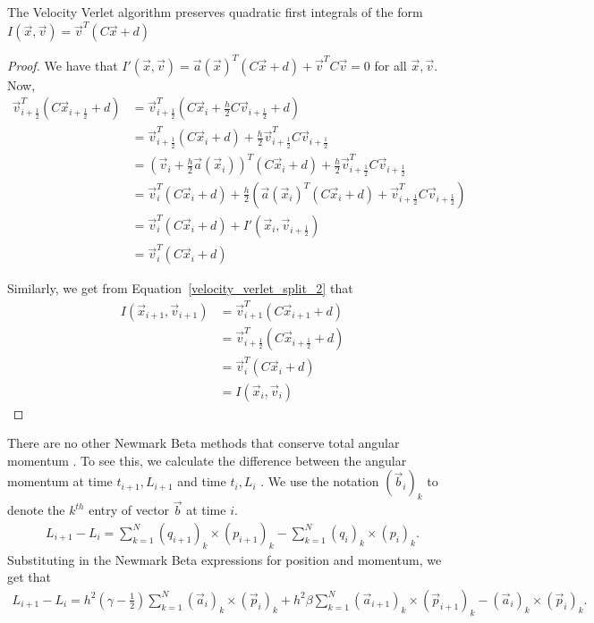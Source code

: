 \documentclass[../Main.tex]{subfiles}
\begin{document}
\begin{theorem} The Velocity Verlet algorithm preserves quadratic first integrals of the form $I(\vec{x}, \vec{v}) = \vec{v}^{T}\left(C\vec{x} + d\right)$ \label{thm:specific_quadratic_first_integral_preservation} \end{theorem}
\begin{proof}
We have that $I'(\vec{x}, \vec{v}) = \vec{a}(\vec{x})^{T}\left(C\vec{x} + d\right) + \vec{v}^{T}C\vec{v} = 0$ for all $\vec{x}, \vec{v}$.
Now,
\begin{align*}
\vec{v}_{i+\frac{1}{2}}^{T}\left(C\vec{x}_{i+\frac{1}{2}} + d\right) &= \vec{v}_{i+\frac{1}{2}}^{T}\left(C\vec{x}_{i} + \frac{h}{2}C\vec{v}_{i+\frac{1}{2}} + d\right) \\
&= \vec{v}_{i+\frac{1}{2}}^{T}\left(C\vec{x}_{i} + d\right) + \frac{h}{2}\vec{v}_{i+\frac{1}{2}}^{T}C\vec{v}_{i+\frac{1}{2}} \\
&= \left(\vec{v}_{i} + \frac{h}{2}\vec{a}(\vec{x}_{i})\right)^{T}\left(C\vec{x}_{i} + d\right)+ \frac{h}{2}\vec{v}_{i+\frac{1}{2}}^{T}C\vec{v}_{i+\frac{1}{2}} \\
&=\vec{v}_{i}^{T}(C\vec{x}_{i} + d) + \frac{h}{2}\left( \vec{a}(\vec{x}_{i})^{T}(C\vec{x}_{i} + d) + \vec{v}_{i+\frac{1}{2}}^{T}C\vec{v}_{i+\frac{1}{2}}\right) \\
&=\vec{v}_{i}^{T}(C\vec{x}_{i} + d) + I'(\vec{x}_{i}, \vec{v}_{i+\frac{1}{2}}) \\
&=\vec{v}_{i}^{T}(C\vec{x}_{i} + d)
\end{align*}

Similarly, we get from Equation~\ref{velocity_verlet_split_2} that
\begin{align*}
I(\vec{x}_{i+1}, \vec{v}_{i+1}) &=\vec{v}_{i+1}^{T}(C\vec{x}_{i+1} + d) \\
&= \vec{v}_{i+\frac{1}{2}}^{T}\left(C\vec{x}_{i+\frac{1}{2}} + d\right) \\
&=\vec{v}_{i}^{T}(C\vec{x}_{i} + d) \\
&= I(\vec{x}_{i}, \vec{v}_{i})
\end{align*}
\end{proof}

There are no other Newmark Beta methods that conserve total angular momentum \cite{Newmark1959}. To see this, we calculate
the difference between the angular momentum at time $t_{i+1}, L_{i+1}$ and time $t_{i}, L_{i}$ \cite{SimoTarnowWong1992}. We use the notation $\left(\vec{b}_{i}\right)_{k}$ to denote the $k^{th}$ entry of vector $\vec{b}$ at time $i$.
\begin{align*}
L_{i+1} -  L_{i} = \sum_{k=1}^{N}\left(q_{i+1}\right)_{k} \times \left(p_{i+1}\right)_{k} - \sum_{k=1}^{N}\left(q_{i}\right)_{k} \times \left(p_{i}\right)_{k}.
\end{align*}
Substituting in the Newmark Beta expressions for position and momentum, we get that
\begin{align}
L_{i+1} -  L_{i} = h^{2}\left(\gamma - \frac{1}{2}\right)\sum_{k=1}^{N} (\vec{a}_{i})_{k} \times (\vec{p}_{i})_{k} + h^{2}\beta\sum_{k=1}^{N} (\vec{a}_{i+1})_{k} \times (\vec{p}_{i+1})_{k} - (\vec{a}_{i})_{k} \times (\vec{p}_{i})_{k} . \label{eqn:angular_momentum_diff_identity}
\end{align}
\end{document}
